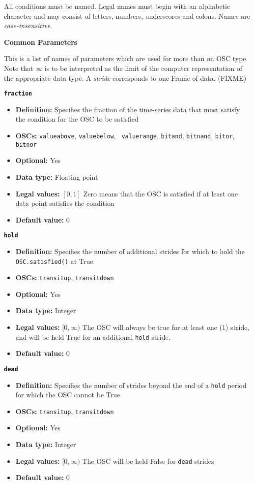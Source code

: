 \documentclass[11pt]{article}
\begin{document}
All conditions must be named.  Legal names must begin with an alphabetic 
character and may consist of letters, numbers, underscores and colons.  
Names are \textit{case-insensitive}.

\begin{center}
  \textbf{Common Parameters}
\end{center}

This is a list of names of parameters which are used for more than on
OSC type.  Note that $\infty$ is to be interpreted as the limit of the
computer representation of the appropriate data type.  A \textit{stride}
corresponds to one Frame of data. (FIXME)

{\large\texttt{\textbf{fraction}}}
\begin{itemize}
\item \textbf{Definition:} Specifies the fraction of the time-series data
  that  must satisfy the condition for the OSC to be satisfied
\item \textbf{OSCs:} \texttt{valueabove}, \texttt{valuebelow}, \texttt{
    valuerange}, \texttt{bitand}, \texttt{bitnand}, \texttt{bitor}, \texttt{
    bitnor} 
\item \textbf{Optional:} Yes
\item \textbf{Data type:} Floating point  
\item \textbf{Legal values:} $[0, 1]$ Zero means that the OSC is
  satisfied if at least one data point satisfies the condition
\item \textbf{Default value:} $0$
\end{itemize}

{\large\texttt{\textbf{hold}}}
\begin{itemize}
\item \textbf{Definition:} Specifies the number of additional strides for
  which to hold the \texttt{OSC.satisfied()} at True.
\item \textbf{OSCs:} \texttt{transitup}, \texttt{transitdown}
\item \textbf{Optional:} Yes
\item \textbf{Data type:} Integer
\item \textbf{Legal values:} $[0, \infty)$ The OSC will always be true
  for at least one (1) stride, and will be held True for an
  additional \texttt{hold} stride.
\item \textbf{Default value:} $0$
\end{itemize}

{\large\texttt{\textbf{dead}}}
\begin{itemize}
\item \textbf{Definition:} Specifies the number of strides beyond the end
  of a \texttt{hold} period for which the OSC cannot be True
\item \textbf{OSCs:} \texttt{transitup}, \texttt{transitdown}
\item \textbf{Optional:} Yes
\item \textbf{Data type:} Integer
\item \textbf{Legal values:} $[0, \infty)$ The OSC will be held False for
  \texttt{dead} strides
\item \textbf{Default value:} $0$
\end{itemize}
\end{document}
